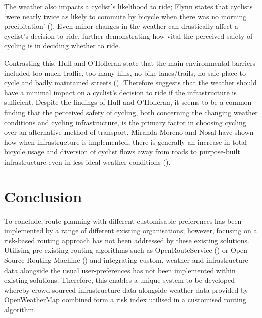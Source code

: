 The weather also impacts a cyclist's likelihood to ride; Flynn states that cyclists `were nearly twice as likely to commute by bicycle when there was no morning precipitation' (\cite{flynn_weather_2012}). Even minor changes in the weather can drastically affect a cyclist's decision to ride, further demonstrating how vital the perceived safety of cycling is in deciding whether to ride. 

Contrasting this, Hull and O'Holleran state that the main environmental barriers included too much traffic, too many hills, no bike lanes/trails, no safe place to cycle and badly maintained streets (\cite{hull_bicycle_2014}). Therefore suggests that the weather should have a minimal impact on a cyclist's decision to ride if the infrastructure is sufficient. Despite the findings of Hull and O'Holleran, it seems to be a common finding that the perceived safety of cycling, both concerning the changing weather conditions and cycling infrastructure, is the primary factor in choosing cycling over an alternative method of transport. Miranda-Moreno and Nosal have shown how when infrastructure is implemented, there is generally an increase in total bicycle usage and diversion of cyclist flows away from roads to purpose-built infrastructure even in less ideal weather conditions (\cite{miranda-moreno_weather_2011}).

\section{Conclusion}
\label{litrev:conclusion}

To conclude, route planning with different customisable preferences has been implemented by a range of different existing organisations; however, focusing on a risk-based routing approach has not been addressed by these existing solutions. Utilising pre-existing routing algorithms such as OpenRouteService (\cite{noauthor_openrouteservice_nodate}) or Open Source Routing Machine (\cite{noauthor_project_nodate}) and integrating custom, weather and infrastructure data alongside the usual user-preferences has not been implemented within existing solutions. Therefore, this enables a unique system to be developed whereby crowd-sourced infrastructure data alongside weather data provided by OpenWeatherMap combined form a risk index utilised in a customised routing algorithm.
